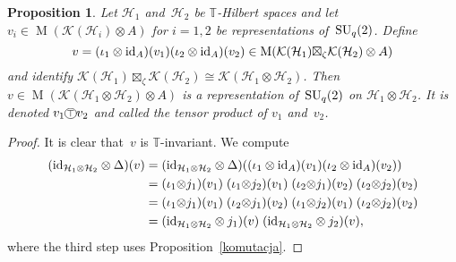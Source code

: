 \documentclass[a4paper]{amsart}
\numberwithin{equation}{section}
\newtheorem{Prop}[Thm]{Proposition}
\theoremstyle{definition}
\theoremstyle{remark}
\begin{document}
\begin{Prop}
  \label{tensprod}
  Let $\mathcal{H}_1$ and~$\mathcal{H}_2$ be $\mathbb{T}${\nobreakdash}-Hilbert
  spaces and let $v_i\in {\operatorname{M}}(\mathcal{K}(\mathcal{H}_i)\otimes A)$
  for \(i=1,2\) be representations of~${\textup{SU}}_q(2)$.  Define
  \[
  v = (\iota_1\otimes{\textup{id}}_{{A}})(v_1)
  (\iota_2\otimes{\textup{id}}_{{A}})(v_2)
  \in{\operatorname{M}}(\mathcal{K}(\mathcal{H}_1){\boxtimes}_\zeta
  \mathcal{K}(\mathcal{H}_2)\otimes A)
  \]
  and identify $\mathcal{K}(\mathcal{H}_1){\boxtimes}_\zeta
  \mathcal{K}(\mathcal{H}_2) \cong
  \mathcal{K}(\mathcal{H}_1\otimes\mathcal{H}_2)$.  Then $v \in
  {\operatorname{M}}(\mathcal{K}(\mathcal{H}_1\otimes\mathcal{H}_2)\otimes A)$ is a
  representation of~${\textup{SU}}_q(2)$ on $\mathcal{H}_1\otimes
  \mathcal{H}_2$.  It is denoted $v_1{\mathbin{\xymatrix{*+<.7ex>[o][F-]{\scriptstyle\top}}}} v_2$ and called the
  \emph{tensor product} of $v_1$ and~$v_2$.
\end{Prop}

\begin{proof}
  It is clear that~\(v\) is \(\mathbb{T}\){\nobreakdash}-invariant.  We compute
  \begin{align*}
    ({\textup{id}}_{\mathcal{H}_1\otimes \mathcal{H}_2}\otimes\Delta)(v)
    &= ({\textup{id}}_{\mathcal{H}_1\otimes \mathcal{H}_2}\otimes\Delta)
    ((\iota_1\otimes{\textup{id}}_{{A}}) (v_1)(\iota_2\otimes{\textup{id}}_{{A}})(v_2))\\
    &= (\iota_1{\otimes} j_{1})(v_1)\;(\iota_1{\otimes} j_{2})(v_1)\;
    (\iota_2{\otimes} j_{1})(v_2)\;(\iota_2{\otimes} j_{2})(v_2)
    \\&= (\iota_1{\otimes} j_{1})(v_1)\;(\iota_2{\otimes} j_{1})(v_2)\;
    (\iota_1{\otimes} j_{2})(v_1)\; (\iota_2{\otimes} j_{2})(v_2)
    \\&= ({\textup{id}}_{\mathcal{H}_1\otimes \mathcal{H}_2}\otimes j_1)(v)\;
    ({\textup{id}}_{\mathcal{H}_1\otimes \mathcal{H}_2}\otimes j_2)(v),
  \end{align*}
  where the third step uses Proposition~\ref{komutacja}.
\end{proof}
\end{document}
